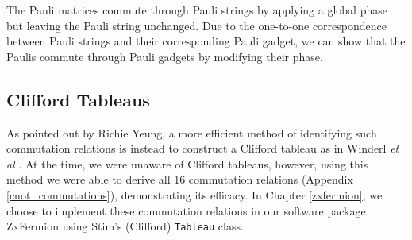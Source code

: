The Pauli matrices commute through Pauli strings by applying a global phase but leaving the Pauli string unchanged. Due to the one-to-one correspondence between Pauli strings and their corresponding Pauli gadget, we can show that the Paulis commute through Pauli gadgets by modifying their phase.


\subsection{Clifford Tableaus}

As pointed out by Richie Yeung, a more efficient method of identifying such commutation relations is instead to construct a Clifford tableau as in Winderl \textit{et al} \cite{Yeung2023}. At the time, we were unaware of Clifford tableaus, however, using this method we were able to derive all 16 commutation relations (Appendix \ref{cnot_commutations}), demonstrating its efficacy. In Chapter \ref{zxfermion}, we choose to implement these commutation relations in our software package ZxFermion using Stim's (Clifford) \lstinline{Tableau} class.
